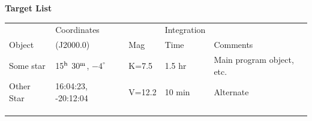 \documentclass{lowell-prop}
\begin{document}
\clearpage



\begin{center}
{\bf Target List} \\[2em]
\begin{tabular}{l l l l l} 
\hline\hline 
       & Coordinates &     & Integration &  \\
Object &  (J2000.0)  & Mag & Time        & Comments \\ [0.5ex] 
\hline 
Some star  & 15$^{\rm h}$ 30$^{\rm m}$, $-4^{\circ}$ & 
K=7.5 & 1.5 hr & Main program object, etc. \\
Other Star & 16:04:23, -20:12:04 & V=12.2  & 10 min  & Alternate \\
   &   &   &   & \\
   &   &   &   & \\
   &   &   &   & \\  [1ex] 
\hline 
\end{tabular}
\end{center}
\end{document}
